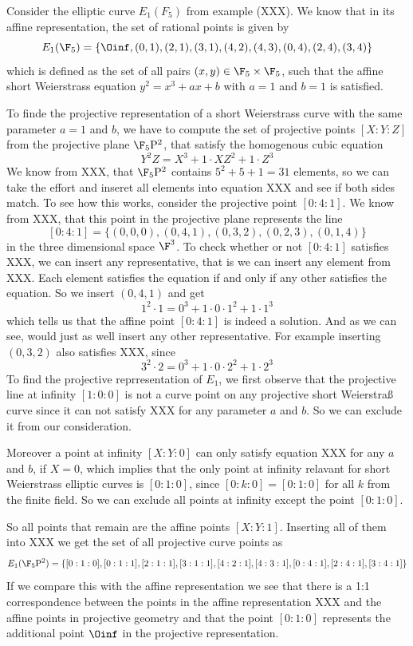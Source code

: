 \begin{example}Consider the elliptic curve $E_1(F_5)$ from example (XXX). We know that in its affine representation, the set of rational points is given by 
$$
E_1(\F_5) = \{\Oinf, (0,1),(2,1),(3,1),(4,2),(4,3),(0,4),(2,4),(3,4)\}
$$
which is defined as the set of all pairs $(x,y)\in \F_5\times \F_5$, such that the affine short Weierstrass equation $y^2 = x^3 + ax +b$ with $a=1$ and $b=1$ is satisfied.

To finde the projective representation of a short Weierstrass curve with the same parameter $a=1$ and $b$, we have to compute the set of projective points $[X:Y:Z]$ from the projective plane $\F_5\mathrm{P}^2$, that satisfy the homogenous cubic equation 
$$
Y^2Z = X^3 + 1\cdot XZ^2 + 1\cdot Z^3
$$
We know from XXX, that $\F_5\mathrm{P}^2$ contains $5^2+5+1= 31$ elements, so we can take the effort and inseret all elements into equation XXX and see if both sides match. To see how this works, consider the projective point $[0:4:1]$. We know from XXX, that this point in the projective plane represents the line
$$
[0:4:1] = \{(0,0,0),(0,4,1),(0,3,2),(0,2,3),(0,1,4)\}
$$  
in the three dimensional space $\F^3$. To check whether or not $[0:4:1]$ satisfies XXX, we can insert any representative, that is we can insert any element from XXX. Each element satisfies the equation if and only if any other satisfies the equation. So we insert $(0,4,1)$ and get
$$
1^2\cdot 1 = 0^3 + 1\cdot 0\cdot 1^2 + 1\cdot 1^3
$$
which tells us that the affine point $[0:4:1]$ is indeed a solution. And as we can see, would just as well insert any other representative. For example inserting $(0,3,2)$ also satisfies XXX, since 
$$
3^2\cdot 2 = 0^3 + 1\cdot 0\cdot 2^2 + 1\cdot 2^3
$$
To find the projective reprresentation of $E_1$, we first observe that the projective line at infinity $[1:0:0]$ is not a curve point on any projective short Weierstraß curve since it can not satisfy XXX for any parameter $a$ and $b$. So we can exclude it from our consideration. 

Moreover a point at infinity $[X:Y:0]$ can only satisfy equation XXX for any $a$ and $b$, if $X=0$, which implies that the only point at infinity relavant for short Weierstrass elliptic curves is $[0:1:0]$, since $[0:k:0]= [0:1:0]$ for all $k$ from the finite field. So we can exclude all points at infinity except the point $[0:1:0]$.

So all points that remain are the affine points $[X:Y:1]$. Inserting all of them into XXX we get the set of all projective curve points as
$$
E_1(\F_5\mathrm{P}^2)=\{[0:1:0], [0:1:1], [2:1:1], [3:1:1], [4:2:1], [4:3:1], [0:4:1], [2:4:1], [3:4:1]\}
$$
If we compare this with the affine representation we see that there is a 1:1 correspondence between the points in the affine representation XXX and the affine points in projective geometry and that the point $[0:1:0]$ represents the additional point $\Oinf$ in the projective representation.
\end{example}
